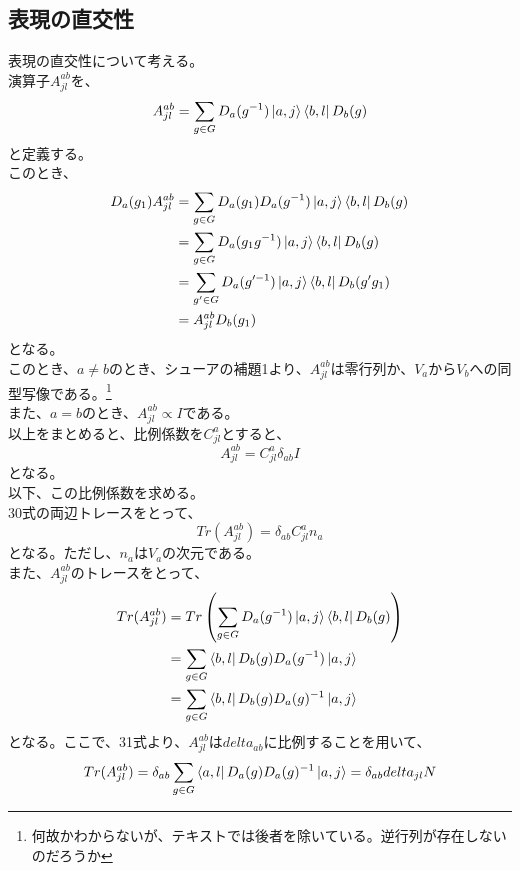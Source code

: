 \documentclass[a4paper,11pt]{jsarticle}
\begin{document}
\subsection{表現の直交性}
表現の直交性について考える。\\
演算子$A^{ab}_{jl}$を、
\begin{equation}
    A^{ab}_{jl} = \sum _{g \in G} D_a (g^{-1}) \ket*{a,j}\bra{b,l}D_b(g)
\end{equation}
と定義する。\\
このとき、
\begin{align}
    D_a(g_1)A^{ab}_{jl}&= \sum _{g \in G} D_a (g_1)D_a (g^{-1}) \ket*{a,j}\bra{b,l}D_b(g)\\
    &= \sum _{g \in G} D_a (g_1g^{-1}) \ket*{a,j}\bra{b,l}D_b(g)\\
    &= \sum _{g' \in G} D_a (g'^{-1}) \ket*{a,j}\bra{b,l}D_b(g'g_1)\\
    &= A^{ab}_{jl}D_b(g_1)
\end{align}
となる。\\
このとき、$a\neq b $のとき、シューアの補題1より、$A^{ab}_{jl}$は零行列か、$V_a$から$V_b$への同型写像である。\footnote{何故かわからないが、テキストでは後者を除いている。逆行列が存在しないのだろうか}\\
また、$a=b$のとき、$A^{ab}_{jl}\propto I$である。\\
以上をまとめると、比例係数を$C_{jl}^a$とすると、
\begin{equation}
    A^{ab}_{jl} = C_{jl}^a \delta_{ab}I
\end{equation}
となる。\\
以下、この比例係数を求める。\\
30式の両辺トレースをとって、
\begin{equation}
    Tr(A^{ab}_{jl}) = \delta_{ab}C_{jl}^a n_a
\end{equation}
となる。ただし、$n_a$は$V_a$の次元である。\\
また、$A^{ab}_{jl}$のトレースをとって、
\begin{align}
    Tr(A^{ab}_{jl})&=Tr\left(\sum _{g \in G} D_a (g^{-1}) \ket*{a,j}\bra{b,l}D_b(g)\right)\\
    &=\sum _{g \in G} \bra{b,l}D_b(g)D_a(g^{-1})\ket*{a,j}\\
    &=\sum _{g \in G} \bra{b,l}D_b(g)D_a(g)^{-1}\ket*{a,j}\\
\end{align}
となる。ここで、31式より、$A^{ab}_{jl}$は$delta_{ab}$に比例することを用いて、
\begin{equation}
    Tr(A^{ab}_{jl}) = \delta_{ab}\sum_{g \in G} \bra{a,l}D_a(g)D_a(g)^{-1}\ket*{a,j} = \delta_{ab}delta_{jl}N
\end{equation}
\end{document}

